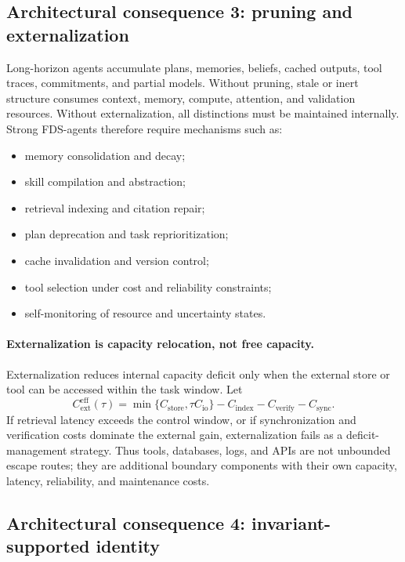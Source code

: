 \documentclass[10pt,a4paper,twocolumn,aps,prl]{revtex4-2}
\begin{document}
\subsection{Architectural consequence 3: pruning and externalization}

Long-horizon agents accumulate plans, memories, beliefs, cached outputs, tool traces, commitments, and partial models. Without pruning, stale or inert structure consumes context, memory, compute, attention, and validation resources. Without externalization, all distinctions must be maintained internally. Strong FDS-agents therefore require mechanisms such as:
\begin{itemize}[leftmargin=2em]
    \item memory consolidation and decay;
    \item skill compilation and abstraction;
    \item retrieval indexing and citation repair;
    \item plan deprecation and task reprioritization;
    \item cache invalidation and version control;
    \item tool selection under cost and reliability constraints;
    \item self-monitoring of resource and uncertainty states.
\end{itemize}

\paragraph{Externalization is capacity relocation, not free capacity.}
Externalization reduces internal capacity deficit only when the external store or tool can be accessed within the task window. Let
\[
C_{\mathrm{ext}}^{\mathrm{eff}}(\tau)=
\min\{C_{\mathrm{store}},\tau C_{\mathrm{io}}\}-
C_{\mathrm{index}}-
C_{\mathrm{verify}}-
C_{\mathrm{sync}}.
\]
If retrieval latency exceeds the control window, or if synchronization and verification costs dominate the external gain, externalization fails as a deficit-management strategy. Thus tools, databases, logs, and APIs are not unbounded escape routes; they are additional boundary components with their own capacity, latency, reliability, and maintenance costs.

\subsection{Architectural consequence 4: invariant-supported identity}
\end{document}
